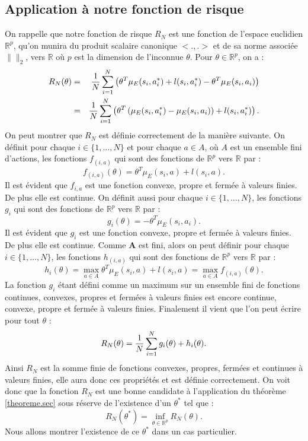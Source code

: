 \documentclass[publibook-draft]{CAp2012}
\newcommand{\A}{\mathbf{A}}
\begin{document}
\subsection{Application à notre fonction de risque}
On rappelle que notre fonction de risque $R_N$ est une fonction de l'espace euclidien $\mathbb{R}^p$, qu'on munira du produit scalaire canonique $<.,.>$ et de sa norme associée $\|\|_2$, vers $\mathbb{R}$ où $p$ est la dimension de l'inconnue $\theta$. Pour $\theta\in\mathbb{R}^p$, on a :
\begin{eqnarray}
   R_N(\theta) &=& {1\over N} \sum_{i=1}^N\left(\theta ^T \mu_E(s_i,a^*_i) + l(s_i,a^*_i) - \theta ^T \mu_E(s_i,a_i) \right)\\
   &=& {1\over N} \sum_{i=1}^N\left(\theta^T\left(\mu_E(s_i,a^*_i) - \mu_E(s_i,a_i)\right) + l(s_i,a^*_i)  \right).
\end{eqnarray}
On peut montrer que $R_N$ est définie correctement de la manière suivante.
On définit pour chaque $i\in\{1,\dots,N\}$ et pour chaque $a\in A$, où $A$ est un ensemble fini d'actions, les fonctions $f_{(i,a)}$ qui sont des fonctions de $\mathbb{R}^p$ vers $\mathbb{R}$ par :
\begin{equation}
f_{(i,a)}({\theta})=\theta ^T \mu_E(s_i,a) + l(s_i,a).
\end{equation}
Il est évident que $f_{i,a}$ est une fonction convexe, propre et fermée à valeurs finies. De plus elle est continue. On définit aussi pour chaque $i\in\{1,\dots,N\}$, les fonctions $g_{i}$ qui sont des fonctions de $\mathbb{R}^p$ vers $\mathbb{R}$ par :
\begin{equation}
g_{i}({\theta})=-\theta ^T \mu_E(s_i,a_i).
\end{equation}
Il est évident que $g_{i}$ est une fonction convexe, propre et fermée à valeurs finies. De plus elle est continue.
Comme $\A$ est fini, alors on peut définir pour chaque $i\in\{1,\dots,N\}$, les fonctions $h_{(i,a)}$ qui sont des fonctions de $\mathbb{R}^p$ vers $\mathbb{R}$ par :
\begin{equation}
h_{i}({\theta})=\max_{a \in A}\theta ^T \mu_E(s_i,a) + l(s_i,a)=\max_{a \in A}f_{(i,a)}({\theta}).
\end{equation}
La fonction $g_{i}$ étant défini comme un maximum sur un ensemble fini de fonctions continues, convexes, propres et fermées à valeurs finies est encore continue, convexe, propre et fermée à valeurs finies.
Finalement il vient que l'on peut écrire pour tout $\theta$ :
\begin{equation}
R_N(\theta) = {1\over N} \sum_{i=1}^N g_{i}({\theta})+h_{i}({\theta}).
\end{equation}
Ainsi $R_N$ est la somme finie de fonctions convexes, propres, fermées et continues à valeurs finies, elle aura donc ces propriétés et est définie correctement. On voit donc que la fonction $R_N$ est une bonne candidate à l'application du théorème \ref{theoreme.sec} sous réserve de l'existence d'un $\theta^*$ tel que :
\begin{equation}
R_N(\theta^*)=\inf_{\theta \in \mathbb{R}^p}R_N(\theta).
\end{equation}
Nous allons montrer l'existence de ce $\theta^*$ dans un cas particulier.
\end{document}
